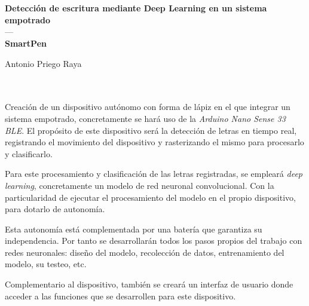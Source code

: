 \chapter*{}




\cleardoublepage
\thispagestyle{empty}

\begin{center}
{\large\bfseries Detección de escritura mediante Deep Learning en
un sistema empotrado\\
}
\textsc{---}\\
{\small\bfseries SmartPen}\\
\end{center}
\begin{center}
Antonio Priego Raya\\
\end{center}

\\

\vspace{0.7cm}
\\

Creación de un dispositivo autónomo con forma de lápiz en el que integrar un
sistema empotrado, concretamente se hará uso de la \textit{Arduino Nano Sense 33 BLE}.
El propósito de este dispositivo será la detección de letras en tiempo
real, registrando el movimiento del dispositivo y rasterizando el mismo
para procesarlo y clasificarlo.

Para este procesamiento y clasificación de las letras registradas, se empleará
\textit{deep learning}, concretamente un modelo de red neuronal convolucional. Con la
particularidad de ejecutar el procesamiento del modelo en el propio
dispositivo, para dotarlo de autonomía.

Esta autonomía está complementada por una batería que garantiza su independencia.
Por tanto se desarrollarán todos los pasos propios del trabajo con
redes neuronales: diseño del modelo, recolección de datos, entrenamiento
del modelo, su testeo, etc.

Complementario al dispositivo, también se creará un interfaz de usuario donde acceder
a las funciones que se desarrollen para este dispositivo.
\cleardoublepage


\thispagestyle{empty}

